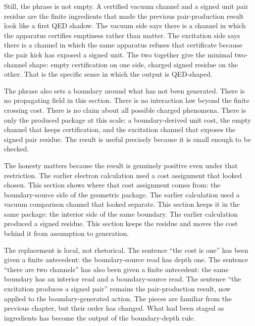Still, the phrase is not empty. A certified vacuum channel and a signed unit pair
residue are the finite ingredients that made the previous pair-production result look
like a first QED shadow. The vacuum side says there is a channel in which the
apparatus certifies emptiness rather than matter. The excitation side says there is a
channel in which the same apparatus refuses that certificate because the pair kick
has exposed a signed unit. The two together give the minimal two-channel shape:
empty certification on one side, charged signed residue on the other. That is the
specific sense in which the output is QED-shaped.

The phrase also sets a boundary around what has not been generated. There is no
propagating field in this section. There is no interaction law beyond the finite
crossing cost. There is no claim about all possible charged phenomena. There is only
the produced package at this scale: a boundary-derived unit cost, the empty channel
that keeps certification, and the excitation channel that exposes the signed pair
residue. The result is useful precisely because it is small enough to be checked.

The honesty matters because the result is genuinely positive even under that
restriction. The earlier electron calculation used a cost assignment that looked
chosen. This section shows where that cost assignment comes from: the boundary-source
side of the geometric package. The earlier calculation used a vacuum comparison
channel that looked separate. This section keeps it in the same package: the
interior side of the same boundary. The earlier calculation produced a signed
residue. This section keeps the residue and moves the cost behind it from assumption
to generation.

The replacement is local, not rhetorical. The sentence ``the cost is one'' has been
given a finite antecedent: the boundary-source read has depth one. The sentence
``there are two channels'' has also been given a finite antecedent: the same boundary
has an interior read and a boundary-source read. The sentence ``the excitation
produces a signed pair'' remains the pair-production result, now applied to the
boundary-generated action. The pieces are familiar from the previous chapter, but
their order has changed. What had been staged as ingredients has become the output of
the boundary-depth rule.


